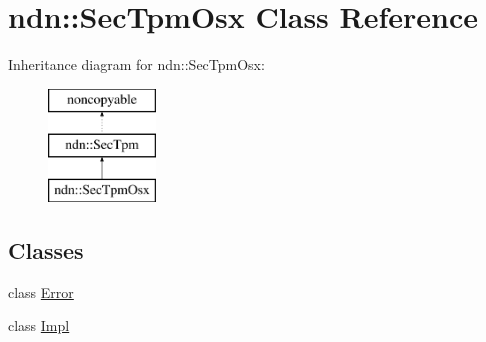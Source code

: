 \hypertarget{classndn_1_1SecTpmOsx}{}\section{ndn\+:\+:Sec\+Tpm\+Osx Class Reference}
\label{classndn_1_1SecTpmOsx}
Inheritance diagram for ndn\+:\+:Sec\+Tpm\+Osx\+:\begin{figure}[H]
\begin{center}
\leavevmode
\includegraphics[height=3.000000cm]{classndn_1_1SecTpmOsx}
\end{center}
\end{figure}
\subsection*{Classes}
\begin{DoxyCompactItemize}
\item 
class \hyperlink{classndn_1_1SecTpmOsx_1_1Error}{Error}
\item 
class \hyperlink{classndn_1_1SecTpmOsx_1_1Impl}{Impl}
\end{DoxyCompactItemize}
